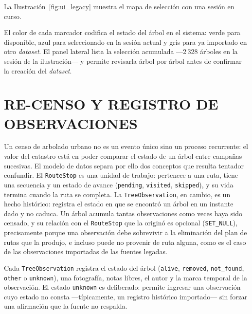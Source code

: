 La Ilustración~\ref{fig:ui_legacy} muestra el mapa de selección con una sesión en curso.


El color de cada marcador codifica el estado del árbol en el sistema: verde para disponible, azul para seleccionado en la sesión actual y gris para ya importado en otro \textit{dataset}. El panel lateral lista la selección acumulada ---2\,328 árboles en la sesión de la ilustración--- y permite revisarla árbol por árbol antes de confirmar la creación del \textit{dataset}.

\section{RE-CENSO Y REGISTRO DE OBSERVACIONES}
\label{sec:recenso}

Un censo de arbolado urbano no es un evento único sino un proceso recurrente: el
valor del catastro está en poder comparar el estado de un árbol entre campañas
sucesivas. El modelo de datos separa por ello dos conceptos que resulta tentador
confundir. El \texttt{RouteStop} es una unidad de trabajo: pertenece a una
ruta, tiene una secuencia y un estado de avance (\texttt{pending}, \texttt{visited},
\texttt{skipped}), y su vida termina cuando la ruta se completa. La
\texttt{TreeObservation}, en cambio, es un hecho histórico: registra el
estado en que se encontró un árbol en un instante dado y no caduca. Un árbol acumula
tantas observaciones como veces haya sido censado, y su relación con el
\texttt{RouteStop} que la originó es opcional (\texttt{SET\_NULL}), precisamente
porque una observación debe sobrevivir a la eliminación del plan de rutas que la
produjo, e incluso puede no provenir de ruta alguna, como es el caso de las
observaciones importadas de las fuentes legadas.

Cada \texttt{TreeObservation} registra el estado del árbol (\texttt{alive},
\texttt{removed}, \texttt{not\_found}, \texttt{other} o \texttt{unknown}), una
fotografía, notas libres, el autor y la marca temporal de la observación. El estado
\texttt{unknown} es deliberado: permite ingresar una observación cuyo estado no consta
---típicamente, un registro histórico importado--- sin forzar una afirmación que la
fuente no respalda.

